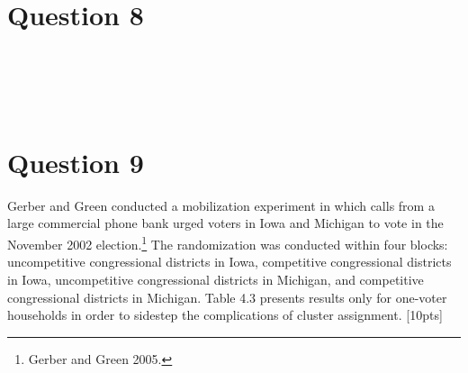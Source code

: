 \documentclass[11pt,notitlepage]{article}\usepackage[]{graphicx}\usepackage[]{color}
\makeatletter
\newenvironment{kframe}{%
 \def\at@end@of@kframe{}%
 \ifinner\ifhmode%
  \def\at@end@of@kframe{\end{minipage}}%
  \begin{minipage}{\columnwidth}%
 \fi\fi%
 \def\FrameCommand##1{\hskip\@totalleftmargin \hskip-\fboxsep
 \colorbox{shadecolor}{##1}\hskip-\fboxsep
     \hskip-\linewidth \hskip-\@totalleftmargin \hskip\columnwidth}%
 \MakeFramed {\advance\hsize-\width
   \@totalleftmargin\z@ \linewidth\hsize
   \@setminipage}}%
 {\par\unskip\endMakeFramed%
 \at@end@of@kframe}
\newenvironment{knitrout}{}{} %
\makeatother
\begin{document}
\section*{Question 8}
\begin{knitrout}
\color{fgcolor}\begin{kframe}
\begin{verbatim}





\end{verbatim}
\end{kframe}
\end{knitrout}


\section*{Question 9}
Gerber and Green conducted a mobilization experiment in which calls from a large commercial phone bank urged voters in Iowa and Michigan to vote in the November 2002 election.\footnote{Gerber and Green 2005.} The randomization was conducted within four blocks: uncompetitive congressional districts in Iowa, competitive congressional districts in Iowa, uncompetitive congressional districts in Michigan, and competitive congressional districts in Michigan. Table 4.3 presents results only for one-voter households in order to sidestep the complications of cluster assignment. [10pts]
\end{document}
